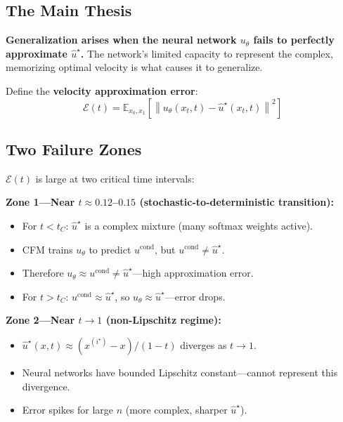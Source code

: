 \documentclass[11pt, a4paper]{article}
\newcommand{\E}{\mathbb{E}}
\newcommand{\norm}[1]{\left\|#1\right\|}
\theoremstyle{plain}
\theoremstyle{definition}
\theoremstyle{remark}
\begin{document}
\subsection{The Main Thesis}

\begin{keybox}
\textbf{Generalization arises when the neural network $u_\theta$ fails to perfectly approximate $\hat{u}^\star$.} The network's limited capacity to represent the complex, memorizing optimal velocity is what causes it to generalize.
\end{keybox}

Define the \textbf{velocity approximation error}:
\[
  \mathcal{E}(t) = \E_{x_0, x_1}\!\left[\norm{u_\theta(x_t, t) - \hat{u}^\star(x_t, t)}^2\right]
\]

\subsection{Two Failure Zones}

\begin{thmbox}
$\mathcal{E}(t)$ is large at two critical time intervals:

\textbf{Zone 1---Near $t \approx 0.12$--$0.15$ (stochastic-to-deterministic transition):}
\begin{itemize}
  \item For $t < t_C$: $\hat{u}^\star$ is a complex mixture (many softmax weights active).
  \item CFM trains $u_\theta$ to predict $u^{\mathrm{cond}}$, but $u^{\mathrm{cond}} \neq \hat{u}^\star$.
  \item Therefore $u_\theta \approx u^{\mathrm{cond}} \neq \hat{u}^\star$---high approximation error.
  \item For $t > t_C$: $u^{\mathrm{cond}} \approx \hat{u}^\star$, so $u_\theta \approx \hat{u}^\star$---error drops.
\end{itemize}

\textbf{Zone 2---Near $t \to 1$ (non-Lipschitz regime):}
\begin{itemize}
  \item $\hat{u}^\star(x,t) \approx (x^{(i^\star)}-x)/(1-t)$ diverges as $t \to 1$.
  \item Neural networks have bounded Lipschitz constant---cannot represent this divergence.
  \item Error spikes for large $n$ (more complex, sharper $\hat{u}^\star$).
\end{itemize}
\end{thmbox}
\end{document}
